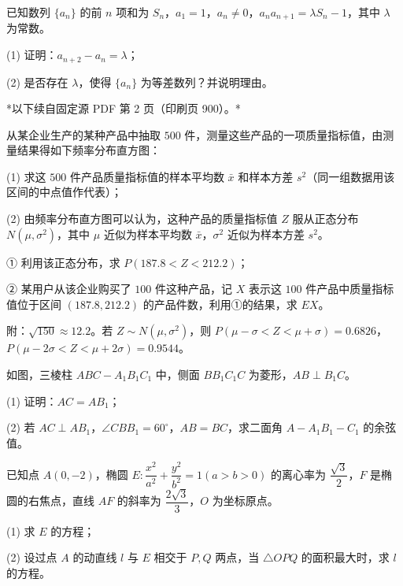\begin{question}
已知数列 $\{a_n\}$ 的前 $n$ 项和为 $S_n$，$a_1=1$，$a_n\ne0$，$a_na_{n+1}=\lambda S_n-1$，其中 $\lambda$ 为常数。

(1) 证明：$a_{n+2}-a_n=\lambda$；

(2) 是否存在 $\lambda$，使得 $\{a_n\}$ 为等差数列？并说明理由。

\par\medskip

*以下续自固定源 PDF 第 2 页（印刷页 900）。*

\Needspace{0.4\textheight}
\end{question}
\begin{question}
从某企业生产的某种产品中抽取 $500$ 件，测量这些产品的一项质量指标值，由测量结果得如下频率分布直方图：
\nopagebreak[4]
\begin{center}\end{center}
\nopagebreak[4]
(1) 求这 $500$ 件产品质量指标值的样本平均数 $\bar x$ 和样本方差 $s^2$（同一组数据用该区间的中点值作代表）；

(2) 由频率分布直方图可以认为，这种产品的质量指标值 $Z$ 服从正态分布 $N(\mu,\sigma^2)$，其中 $\mu$ 近似为样本平均数 $\bar x$，$\sigma^2$ 近似为样本方差 $s^2$。

① 利用该正态分布，求 $P(187.8<Z<212.2)$；

② 某用户从该企业购买了 $100$ 件这种产品，记 $X$ 表示这 $100$ 件产品中质量指标值位于区间 $(187.8,212.2)$ 的产品件数，利用①的结果，求 $EX$。

附：$\sqrt{150}\approx12.2$。若 $Z\sim N(\mu,\sigma^2)$，则 $P(\mu-\sigma<Z<\mu+\sigma)=0.6826$，$P(\mu-2\sigma<Z<\mu+2\sigma)=0.9544$。

\Needspace{0.4\textheight}
\end{question}
\begin{question}
如图，三棱柱 $ABC-A_1B_1C_1$ 中，侧面 $BB_1C_1C$ 为菱形，$AB\perp B_1C$。
\nopagebreak[4]
\begin{center}\end{center}
\nopagebreak[4]
(1) 证明：$AC=AB_1$；

(2) 若 $AC\perp AB_1$，$\angle CBB_1=60^\circ$，$AB=BC$，求二面角 $A-A_1B_1-C_1$ 的余弦值。

\end{question}
\begin{question}
已知点 $A(0,-2)$，椭圆 $E:\dfrac{x^2}{a^2}+\dfrac{y^2}{b^2}=1 (a>b>0)$ 的离心率为 $\dfrac{\sqrt3}{2}$，$F$ 是椭圆的右焦点，直线 $AF$ 的斜率为 $\dfrac{2\sqrt3}{3}$，$O$ 为坐标原点。

(1) 求 $E$ 的方程；

(2) 设过点 $A$ 的动直线 $l$ 与 $E$ 相交于 $P,Q$ 两点，当 $\triangle OPQ$ 的面积最大时，求 $l$ 的方程。

\end{question}

